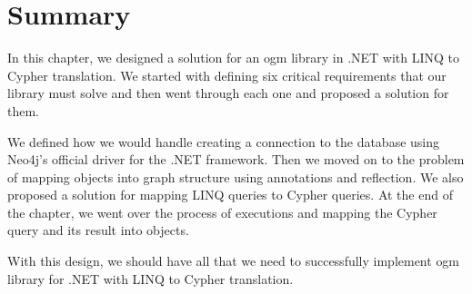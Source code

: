 \section{Summary}

In this chapter, we designed a solution for an \acrshort{ogm} library in .NET with LINQ to Cypher translation.
We started with defining six critical requirements that our library must solve and then went through each one and proposed a solution for them.

We defined how we would handle creating a connection to the database using Neo4j's official driver for the .NET framework.
Then we moved on to the problem of mapping objects into graph structure using annotations and reflection.
We also proposed a solution for mapping LINQ queries to Cypher queries.
At the end of the chapter, we went over the process of executions and mapping the Cypher query and its result into objects.

With this design, we should have all that we need to successfully implement \acrshort{ogm} library for .NET with LINQ to Cypher translation.
